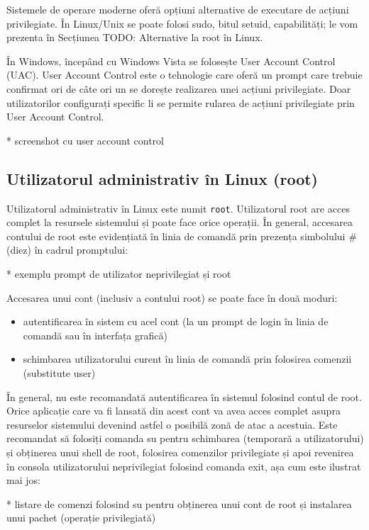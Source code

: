 Sistemele de operare moderne oferă opțiuni alternative de executare de acțiuni
privilegiate. În Linux/Unix se poate folosi sudo, bitul setuid, capabilități; le
vom prezenta în Secțiunea TODO: Alternative la root în Linux.

În Windows, începând cu Windows Vista se folosește User Account Control (UAC).
User Account Control este o tehnologie care oferă un prompt care trebuie
confirmat ori de câte ori un se dorește realizarea unei acțiuni privilegiate.
Doar utilizatorilor configurați specific li se permite rularea de acțiuni
privilegiate prin User Account Control.

* screenshot cu user account control

\subsection{Utilizatorul administrativ în Linux (root)}
\label{sec:users-superuser-root}

Utilizatorul administrativ în Linux este numit \texttt{root}. Utilizatorul root
are acces complet la resursele sistemului și poate face orice operații. În
general, accesarea contului de root este evidențiată în linia de comandă prin
prezența simbolului \# (diez) în cadrul promptului:

* exemplu prompt de utilizator neprivilegiat și root

Accesarea unui cont (inclusiv a contului root) se poate face în două moduri:

\begin{itemize}
	\item autentificarea în sistem cu acel cont (la un prompt de login în
		linia de comandă sau în interfața grafică)
	\item schimbarea utilizatorului curent în linia de comandă prin
		folosirea comenzii  (substitute user)
\end{itemize}

În general, nu este recomandată autentificarea în sistemul folosind contul de
root. Orice aplicație care va fi lansată din acest cont va avea acces complet
asupra resurselor sistemului devenind astfel o posibilă zonă de atac a acestuia.
Este recomandat să folosiți comanda su pentru schimbarea (temporară a
utilizatorului) și obținerea unui shell de root, folosirea comenzilor
privilegiate și apoi revenirea în consola utilizatorului neprivilegiat folosind
comanda exit, așa cum este ilustrat mai jos:

* listare de comenzi folosind su pentru obținerea unui cont de root și instalarea unui pachet (operație privilegiată)

